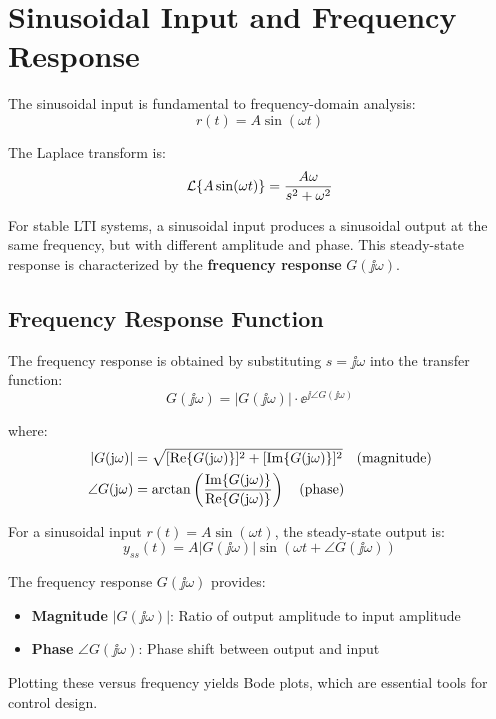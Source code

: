 \section{Sinusoidal Input and Frequency Response}
\label{sec:sinusoidal}

The sinusoidal input is fundamental to frequency-domain analysis:
\begin{equation}
r(t) = A\sin(\omega t)
\end{equation}

The Laplace transform is:
\begin{equation}
\mathcal{L}\{A\sin(\omega t)\} = \frac{A\omega}{s^2 + \omega^2}
\end{equation}

For stable LTI systems, a sinusoidal input produces a sinusoidal output at the same frequency, but with different amplitude and phase. This steady-state response is characterized by the \textbf{frequency response} $G(\jj\omega)$.

\subsection{Frequency Response Function}

The frequency response is obtained by substituting $s = \jj\omega$ into the transfer function:
\begin{equation}
G(\jj\omega) = |G(\jj\omega)| \cdot \ee^{\jj\angle G(\jj\omega)}
\end{equation}

where:
\begin{align}
|G(\mathrm{j}\omega)| &= \sqrt{[\operatorname{Re}\{G(\mathrm{j}\omega)\}]^2 + [\operatorname{Im}\{G(\mathrm{j}\omega)\}]^2} \quad \text{(magnitude)} \\
\angle G(\mathrm{j}\omega) &= \arctan\left(\frac{\operatorname{Im}\{G(\mathrm{j}\omega)\}}{\operatorname{Re}\{G(\mathrm{j}\omega)\}}\right) \quad \text{(phase)}
\end{align}

For a sinusoidal input $r(t) = A\sin(\omega t)$, the steady-state output is:
\begin{equation}
y_{ss}(t) = A|G(\jj\omega)|\sin(\omega t + \angle G(\jj\omega))
\end{equation}

\begin{definitionbox}[title=Frequency Response Interpretation]
The frequency response $G(\jj\omega)$ provides:
\begin{itemize}
    \item \textbf{Magnitude} $|G(\jj\omega)|$: Ratio of output amplitude to input amplitude
    \item \textbf{Phase} $\angle G(\jj\omega)$: Phase shift between output and input
\end{itemize}
Plotting these versus frequency yields Bode plots, which are essential tools for control design.
\end{definitionbox}

